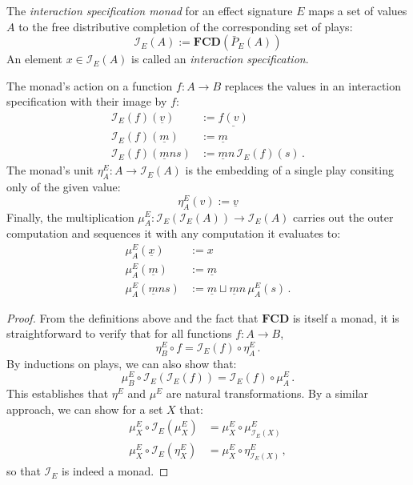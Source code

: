 \documentclass[format=sigplan,authordraft]{acmart}
\begin{document}
\begin{definition} \label{def:intm} %
The \emph{interaction specification monad}
for an effect signature $E$
maps a set of values $A$
to the free distributive completion
of the corresponding set of plays:
\[
    \mathcal{I}_E(A) :=
      \mathbf{FCD}(\bar{P}_E(A))
\]
An element $x \in \mathcal{I}_E(A)$ is called
an \emph{interaction specification}.

The monad's action on a function $f : A \rightarrow B$
replaces the values in
an interaction specification with their image by $f$:
\begin{align*}
  \mathcal{I}_E(f)(\underline{v}) &:= \underline{f(v)} \\
  \mathcal{I}_E(f)(\underline{m}) &:= \underline{m} \\
  \mathcal{I}_E(f)(\underline{m} n s) &:=
    \underline{m} n \, \mathcal{I}_E(f)(s) \,.
\end{align*}
The monad's unit
$\eta^E_A : A \rightarrow \mathcal{I}_E(A)$
is the embedding of a single play
consiting only of the given value:
\[
    \eta^E_A(v) := \underline{v}
\]
Finally, the multiplication
$\mu^E_A : \mathcal{I}_E(\mathcal{I}_E(A)) \rightarrow \mathcal{I}_E(A)$
carries out the outer computation and
sequences it with any computation it evaluates to:
\begin{align*}
  \mu^E_A(\underline{x}) &:= x \\
  \mu^E_A(\underline{m}) &:= \underline{m} \\
  \mu^E_A(\underline{m} n s) &:=
    \underline{m} \sqcup \underline{m} n \, \mu^E_A(s) \,.
\end{align*}

\begin{proof} %
From the definitions above and
the fact that $\mathbf{FCD}$ is itself a monad,
it is straightforward to verify that
for all functions $f : A \rightarrow B$,
\[
    \eta^E_B \circ f = \mathcal{I}_E(f) \circ \eta^E_A \,.
\]
By inductions on plays, we can also show that:
\[
    \mu^E_B \circ \mathcal{I}_E(\mathcal{I}_E(f)) =
      \mathcal{I}_E(f) \circ \mu^E_A \,.
\]
This establishes that $\eta^E$ and $\mu^E$
are natural transformations.
By a similar approach,
we can show for a set $X$ that:
\begin{align*}
  \mu^E_X \circ \mathcal{I}_E(\mu^E_X) &=
    \mu^E_X \circ \mu^E_{\mathcal{I}_E(X)} \\
  \mu^E_X \circ \mathcal{I}_E(\eta^E_X) &=
    \mu^E_X \circ \eta^E_{\mathcal{I}_E(X)} \,,
\end{align*}
so that $\mathcal{I}_E$ is indeed a monad.
\end{proof}
\end{definition}
\end{document}
